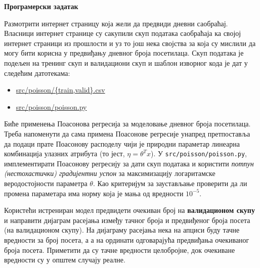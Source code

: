 \item {} \textbf{Програмерски задатак}

Размотрити интернет страницу која жели да предвиди дневни саобраћај. Власници интернет странице су сакупили скуп података саобраћаја ка својој интернет страници из прошлости и уз то још нека својства за која су мислили да могу бити корисна у предвиђању дневног броја посетилаца. Скуп података је подељен на тренинг скуп и валидациони скуп и шаблон изворног кода је дат у следећим датотекама:
\begin{center}
\begin{itemize}
\item 	\url{src/poisson/{train,valid}.csv}
\item   \url{src/poisson/poisson.py}
\end{itemize}
\end{center}
Биће применења Поасонова регресија за моделовање дневног броја посетилаца. Треба напоменути да сама примена Поасонове регресије унапред претпоставља да подаци прате Поасонову расподелу чији је природни параметар линеарна комбинација улазних атрибута (то јест, $\eta = \theta^T x$). У \texttt{src/poisson/poisson.py}, имплементирати Поасонову регресију за дати скуп података и користити \emph{потпун (нестохастички) градијентни успон} за максимизацију логаритамске веродостојности параметра $\theta$. Као критеријум за заустављање проверити да ли промена параметара има норму која је мања од вредности $10^{-5}$.

Користећи истрениран модел предвидети очекиван број на \textbf{валидационом скупу} и направити дијаграм расејања између тачног броја и предвиђеног броја посета (на валидационом скупу). На дијаграму расејања нека на апциси буду тачне вредности за број посета, а а на ординати одговарајућа предвиђања очекиваног броја посета. Приметити да су тачне вредности целобројне, док очекиване вредности су у општем случају реалне.
